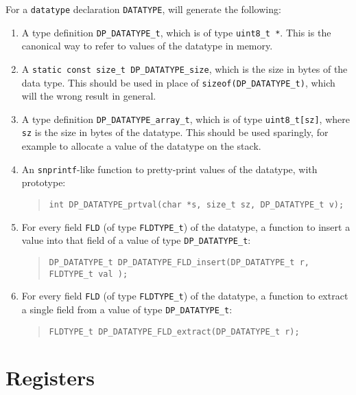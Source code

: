 \documentclass[a4paper,11pt,twoside]{report}
\begin{document}
For a \texttt{datatype} declaration
\texttt{DATATYPE}, \Mac will generate the following:

\begin{enumerate}

\item A type definition \texttt{DP\_DATATYPE\_t}, which is of type
  \texttt{uint8\_t *}.  This is the canonical way to refer to values
  of the datatype in memory. 

\item A \texttt{static const size\_t DP\_DATATYPE\_size}, which is the
  size in bytes of the data type.  This should be used in place of
  \texttt{sizeof(DP\_DATATYPE\_t)}, which will the wrong result in
  general. 

\item A type definition \texttt{DP\_DATATYPE\_array\_t}, which is of type
  \texttt{uint8\_t[sz]}, where \texttt{sz} is the size in bytes of the
  datatype.  This should be used sparingly, for example to allocate a
  value of the datatype on the stack. 

\item An \texttt{snprintf}-like function to pretty-print values of the
  datatype, with prototype:
  \begin{quote}
    \texttt{int DP\_DATATYPE\_prtval(char *s, size\_t sz, DP\_DATATYPE\_t v);}
  \end{quote}

\item For every field \texttt{FLD} (of type \texttt{FLDTYPE\_t}) of the
  datatype, a function to insert a value into that field of a value
  of type \texttt{DP\_DATATYPE\_t}: 
  \begin{quote}
    \texttt{DP\_DATATYPE\_t DP\_DATATYPE\_FLD\_insert(DP\_DATATYPE\_t r, FLDTYPE\_t val );}
  \end{quote}

\item For every field \texttt{FLD} (of type \texttt{FLDTYPE\_t}) of the
  datatype, a function to extract a single field from a value
  of type \texttt{DP\_DATATYPE\_t}: 
  \begin{quote}
    \texttt{FLDTYPE\_t DP\_DATATYPE\_FLD\_extract(DP\_DATATYPE\_t r);}
  \end{quote}

\end{enumerate}


\section{Registers}
\end{document}
